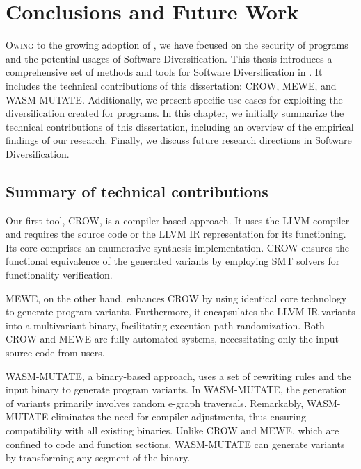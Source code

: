 
\chapter{Conclusions and Future Work}
\label{results}


\lettrine[lines=3]{O}{wing} to the growing adoption of \Wasm, we have focused on the security of \Wasm programs and the potential usages of Software Diversification.
This thesis introduces a comprehensive set of methods and tools for Software Diversification in \Wasm.
It includes the technical contributions of this dissertation: CROW, MEWE, and WASM-MUTATE.
Additionally, we present specific use cases for exploiting the diversification created for \Wasm programs.
In this chapter, we initially summarize the technical contributions of this dissertation, including an overview of the empirical findings of our research.
Finally, we discuss future research directions in \Wasm Software Diversification.

\section{Summary of technical contributions}
Our first tool, CROW, is a compiler-based approach.
It uses the LLVM compiler and requires the source code or the LLVM IR representation for its functioning. 
Its core comprises an enumerative synthesis implementation. 
CROW ensures the functional equivalence of the generated variants by employing SMT solvers for functionality verification.  

MEWE, on the other hand, enhances CROW by using identical core technology to generate program variants. 
Furthermore, it encapsulates the LLVM IR variants into a \Wasm multivariant binary, facilitating execution path randomization. 
Both CROW and MEWE are fully automated systems, necessitating only the input source code from users. 

WASM-MUTATE, a binary-based approach, uses a set of rewriting rules and the input \wasm binary to generate program variants. 
In WASM-MUTATE, the generation of \Wasm variants primarily involves random e-graph traversals. 
Remarkably, WASM-MUTATE eliminates the need for compiler adjustments, thus ensuring compatibility with all existing \Wasm binaries. 
Unlike CROW and MEWE, which are confined to code and function sections, WASM-MUTATE can generate variants by transforming any segment of the \wasm binary.

